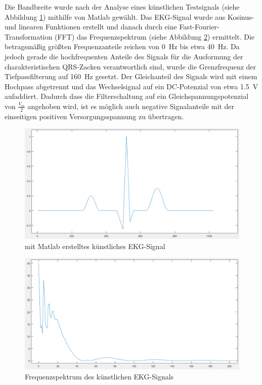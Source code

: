 Die Bandbreite wurde nach der Analyse eines künstlichen Testsignals (siehe Abbildung \ref{fig_Matlab EKG-Signal}) mithilfe von Matlab gewählt. Das EKG-Signal wurde aus Kosinus- und linearen Funktionen erstellt und danach durch eine Fast-Fourier-Transformation (FFT) das Frequenzspektrum (siehe Abbildung \ref{fig_Matlab Frequenzspektrum}) ermittelt. Die betragsmäßig größten Frequenzanteile reichen von \SI{0}{\hertz} bis etwa \SI{40}{\hertz}. Da jedoch gerade die hochfrequenten Anteile des Signals für die Ausformung der charakteristischen QRS-Zacken verantwortlich sind, wurde die Grenzfrequenz der Tiefpassfilterung auf \SI{160}{\hertz} gesetzt. Der Gleichanteil des Signals wird mit einem Hochpass abgetrennt und das Wechselsignal auf ein DC-Potenzial von etwa \SI{1,5}{\volt} aufaddiert. Dadurch dass die Filterschaltung auf ein Gleichspannungspotenzial von $\frac{V_{cc}}{2}$ angehoben wird, ist es möglich auch negative Signalanteile mit der einseitigen positiven Versorgungsspannung zu übertragen.

\begin{figure} [!h]
	\includegraphics[width=\textwidth] {EKG_Signal.png}
	\caption{mit Matlab erstelltes künstliches EKG-Signal}
	\label{fig_Matlab EKG-Signal} 
\end{figure}

\begin{figure} [!h]
	\includegraphics[width=\textwidth] {EKG_diskretes_Frequenzspektrum_Ausschnitt.png}
	\caption{Frequenzspektrum des künstlichen EKG-Signals}
	\label{fig_Matlab Frequenzspektrum} 
\end{figure}


